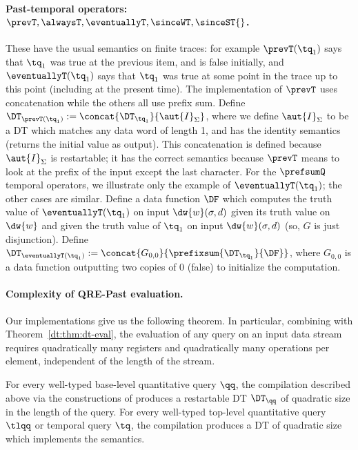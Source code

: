\paragraph*{Past-temporal operators: $\prevT, \alwaysT, \eventuallyT, \sinceWT, \sinceST{}$.}
These have the usual semantics on finite traces: for example $\prevT(\tq_1)$ says that $\tq_1$ was true at the previous item, and is false initially, and $\eventuallyT(\tq_1)$ says that $\tq_1$ was true at some point in the trace up to this point (including at the present time). The implementation of $\prevT$ uses concatenation while the others all use prefix sum. Define $\DT_{\prevT(\tq_1)} := \concat{\DT_{\tq_1}}{\aut{I}_{\Sigma}}$, where we define $\aut{I}_{\Sigma}$ to be a DT which matches any data word of length 1, and has the identity semantics (returns the initial value as output). This concatenation is defined because $\aut{I}_{\Sigma}$ is restartable; it has the correct semantics because $\prevT$ means to look at the prefix of the input except the last character.
For the $\prefsumQ$ temporal operators, we illustrate only the example of $\eventuallyT(\tq_1)$; the other cases are similar. Define a data function $\DF$ which computes the truth value of $\eventuallyT(\tq_1)$ on input $\dw{w} (\sigma, d)$ given its truth value on $\dw{w}$ and given the truth value of $\tq_1$ on input $\dw{w} (\sigma, d)$ (so, $G$ is just disjunction). Define $\DT_{\eventuallyT(\tq_1)} := \concat{G_{0,0}}{\prefixsum{\DT_{\tq_1}}{\DF}}$, where $G_{0,0}$ is a data function outputting two copies of $0$ (false) to initialize the computation.

\paragraph*{Complexity of QRE-Past evaluation.}
Our implementations give us the following theorem. In particular, combining with Theorem~\ref{dt:thm:dt-eval}, the evaluation of any query on an input data stream requires quadratically many registers and quadratically many operations per element, independent of the length of the stream.

\begin{theorem}
For every well-typed base-level quantitative query $\qq$, the compilation described above via the constructions of  produces a restartable DT $\DT_\qq$ of quadratic size in the length of the query. For every well-typed top-level quantitative query $\tlqq$ or temporal query $\tq$, the compilation produces a DT of quadratic size which implements the semantics.
\label{dt:thm:quadratic}
\end{theorem}

